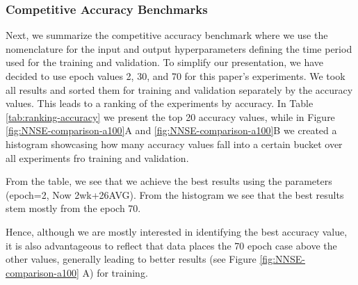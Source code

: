 \documentclass[utf8]{FrontiersinVancouver} %
\newcommand{\TODO}[2]{\todo[inline]{{\bf \color{red} #1} #2}}
\begin{document}
\subsubsection{Competitive Accuracy Benchmarks}

Next, we summarize the competitive accuracy benchmark where
we use the nomenclature for the input and output hyperparameters
defining the time period used for the training and validation.  To
simplify our presentation, we have decided to use epoch values 2, 30, and 70 for this paper's experiments. We took all results and
sorted them for training and validation separately by the accuracy
values. This leads to a ranking of the experiments by accuracy. In
Table \ref{tab:ranking-accuracy} we present the top 20 accuracy
values, while in Figure \ref{fig:NNSE-comparison-a100}A and \ref{fig:NNSE-comparison-a100}B we created a
histogram showcasing how many accuracy values fall into a certain
bucket over all experiments fro training and validation.

From the table, we see that we achieve the best
results using the parameters (epoch=2, Now 2wk+26AVG). From the histogram we see that the best results stem mostly from the epoch 70.

Hence, although we are mostly interested in identifying the best accuracy value, it is also advantageous to reflect that data places the 70 epoch case above the other values, generally leading to better results (see Figure \ref{fig:NNSE-comparison-a100} A) for training.

\TODO{GVL}{make more observations}
\end{document}
